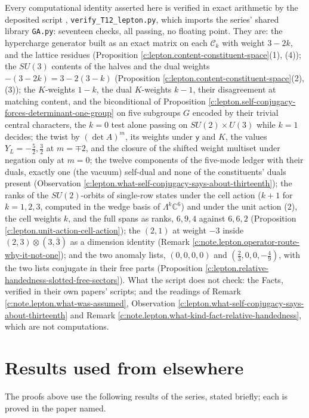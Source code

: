 \documentclass[11pt]{article}
\theoremstyle{definition}
\theoremstyle{plain}
\providecommand{\C}{}\renewcommand{\C}{\mathbb{C}}
\providecommand{\Con}{}\renewcommand{\Con}{\mathcal{C}}
\begin{document}
\label{c:note.lepton.setting-machine-verification}
Every computational identity asserted here is verified in exact arithmetic by the deposited script \cite{ButlerVerifyT12L}, \texttt{verify\_T12\_lepton.py}, which imports the series' shared library \texttt{GA.py}: seventeen checks, all passing, no floating point. They are: the hypercharge generator built as an exact matrix on each $\Con_{k}$ with weight $3 - 2k$, and the lattice residues (Proposition \ref{c:lepton.content-constituent-space}(1), (4)); the $SU(3)$ contents of the halves and the dual weights $-(3-2k) = 3 - 2(3-k)$ (Proposition \ref{c:lepton.content-constituent-space}(2), (3)); the $K$-weights $1 - k$, the dual $K$-weights $k - 1$, their disagreement at matching content, and the biconditional of Proposition \ref{c:lepton.self-conjugacy-forces-determinant-one-group} on five subgroups $G$ encoded by their trivial central characters, the $k = 0$ test alone passing on $SU(2) \times U(3)$ while $k = 1$ decides; the twist by $(\det A)^{m}$, its weights under $\mathsf{y}$ and $K$, the values $Y_{L} = -\tfrac52, \tfrac32$ at $m = \mp 2$, and the closure of the shifted weight multiset under negation only at $m = 0$; the twelve components of the five-mode ledger with their duals, exactly one (the vacuum) self-dual and none of the constituents' duals present (Observation \ref{c:lepton.what-self-conjugacy-says-about-thirteenth}); the ranks of the $SU(2)$-orbits of single-row states under the cell action ($k + 1$ for $k = 1, 2, 3$, computed in the wedge basis of $\Lambda^{k}\C^{6}$) and under the unit action ($2$), the cell weights $k$, and the full spans as ranks, $6, 9, 4$ against $6, 6, 2$ (Proposition \ref{c:lepton.unit-action-cell-action}); the $(2,1)$ at weight $-3$ inside $(2,3) \otimes (3,\bar{3})$ as a dimension identity (Remark \ref{c:note.lepton.operator-route-why-it-not-one}); and the two anomaly lists, $(0, 0, 0, 0)$ and $(\tfrac23, 0, 0, -\tfrac49)$, with the two lists conjugate in their free parts (Proposition \ref{c:lepton.relative-handedness-slotted-free-sectors}). What the script does not check: the Facts, verified in their own papers' scripts; and the readings of Remark \ref{c:note.lepton.what-was-assumed}, Observation \ref{c:lepton.what-self-conjugacy-says-about-thirteenth} and Remark \ref{c:note.lepton.what-kind-fact-relative-handedness}, which are not computations.

\section{Results used from elsewhere}
The proofs above use the following results of the series, stated briefly; each is proved in the paper named.
\end{document}
